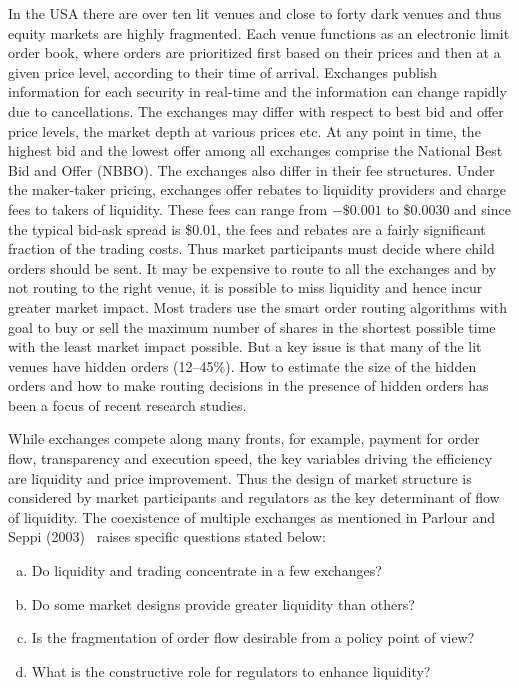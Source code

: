 In the USA there are over ten lit venues and close to forty dark venues and thus equity markets are highly fragmented. Each venue functions as an electronic limit order book, where orders are prioritized first based on their prices and then at a given price level, according to their time of arrival. Exchanges publish information for each security in real-time and the information can change rapidly due to cancellations. The exchanges may differ with respect to best bid and offer price levels, the market depth at various prices etc. At any point in time, the highest bid and the lowest offer among all exchanges comprise the National Best Bid and Offer (NBBO). The exchanges also differ in their fee structures. Under the maker-taker pricing, exchanges offer rebates to liquidity providers and charge fees to takers of liquidity. These fees can range from $-\$0.001$ to \$0.0030 and since the typical bid-ask spread is \$0.01, the fees and rebates are a fairly significant fraction of the trading costs. Thus market participants must decide where child orders should be sent. It may be expensive to route to all the exchanges and by not routing to the right venue, it is possible to miss liquidity and hence incur greater market impact. Most traders use the smart order routing algorithms with goal to buy or sell the maximum number of shares in the shortest possible time with the least market impact possible. But a key issue is that many of the lit venues have hidden orders (12--45\%). How to estimate the size of the hidden orders and how to make routing decisions in the presence of hidden orders has been a focus of recent research studies.


While exchanges compete along many fronts, for example, payment for order flow, transparency and execution speed, the key variables driving the efficiency are liquidity and price improvement. Thus the design of market structure is considered by market participants and regulators as the key determinant of flow of liquidity. The coexistence of multiple exchanges as mentioned in Parlour and Seppi (2003)~\cite{parlour2003} raises specific questions stated below:
\begin{enumerate}[a)]
\item Do liquidity and trading concentrate in a few exchanges?
\item Do some market designs provide greater liquidity than others?
\item Is the fragmentation of order flow desirable from a policy point of view?
\item What is the constructive role for regulators to enhance liquidity?
\end{enumerate}


